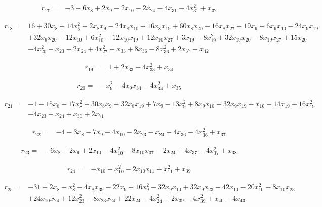 \begin{align*}
r_{17}={}&-3-6x_{8}+2x_{9}-2x_{10}-2x_{24}-4x_{31}-4x_{31}^{2}+x_{32}
\end{align*}

\begin{align*}
r_{18}={}&16+30x_{8}+14x_{8}^{2}-2x_{8}x_{9}-24x_{8}x_{10}-16x_{8}x_{19}+60x_{8}x_{20}-16x_{8}x_{27}+19x_{9}-6x_{9}x_{10}-24x_{9}x_{19}\\
&+32x_{9}x_{20}-12x_{10}+6x_{10}^{2}-12x_{10}x_{19}+12x_{10}x_{27}+3x_{19}-8x_{19}^{2}+32x_{19}x_{20}-8x_{19}x_{27}+15x_{20}\\
&-4x_{20}^{2}-x_{23}-2x_{24}+4x_{27}^{2}+x_{33}+8x_{36}-8x_{36}^{2}+2x_{37}-x_{42}
\end{align*}

\begin{align*}
r_{19}={}&1+2x_{33}-4x_{33}^{2}+x_{34}
\end{align*}

\begin{align*}
r_{20}={}&-x_{9}^{2}-4x_{9}x_{34}-4x_{34}^{2}+x_{35}
\end{align*}

\begin{align*}
r_{21}={}&-1-15x_{8}-17x_{8}^{2}+30x_{8}x_{9}-32x_{8}x_{19}+7x_{9}-13x_{9}^{2}+8x_{9}x_{10}+32x_{9}x_{19}-x_{10}-14x_{19}-16x_{19}^{2}\\
&-4x_{23}+x_{24}+x_{36}+2x_{71}
\end{align*}

\begin{align*}
r_{22}={}&-4-3x_{8}-7x_{9}-4x_{10}-2x_{23}-x_{24}+4x_{36}-4x_{36}^{2}+x_{37}
\end{align*}

\begin{align*}
r_{23}={}&-6x_{8}+2x_{9}+2x_{10}-4x_{10}^{2}-8x_{10}x_{37}-2x_{24}+4x_{37}-4x_{37}^{2}+x_{38}
\end{align*}

\begin{align*}
r_{24}={}&-x_{10}-x_{10}^{2}-2x_{10}x_{11}-x_{11}^{2}+x_{39}
\end{align*}

\begin{align*}
r_{25}={}&-31+2x_{8}-x_{8}^{2}-4x_{8}x_{39}-22x_{9}+16x_{9}^{2}-32x_{9}x_{10}+32x_{9}x_{23}-42x_{10}-20x_{10}^{2}-8x_{10}x_{23}\\
&+24x_{10}x_{24}+12x_{23}^{2}-8x_{23}x_{24}+22x_{24}-4x_{24}^{2}+2x_{39}-4x_{39}^{2}+x_{40}-4x_{43}
\end{align*}

